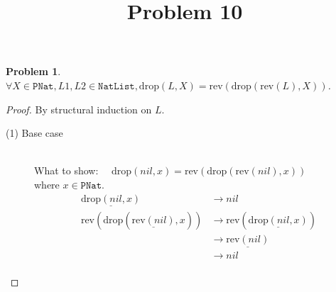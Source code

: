 \documentclass[12pt, a4paper]{article}
\title{Problem 10}
\date{\vspace{-5ex}}
\newtheorem{problem}{Problem}
\newcommand{\rmx}[1]{\mathrm{#1}}
\newcommand{\larrow}{\longrightarrow}
\newcommand{\under}{\underline}
\begin{document}
\maketitle

\begin{problem}
$\forall X \in \mathtt{PNat}, L1, L2 \in \mathtt{NatList}, \rmx{drop}(L, X) = \rmx{rev}(\rmx{drop}(\rmx{rev}(L), X))$.
\end{problem}
\begin{proof}
By structural induction on $L$.

\begin{description}
\item[(1) Base case]~\\
\noindent
What to show: $\quad \rmx{drop}(nil, x) = \rmx{rev}(\rmx{drop}(\rmx{rev}(nil), x))$ \\
where $x \in \mathtt{PNat}$.
\begin{align*}
\under{\rmx{drop}(nil, x)}
	&\larrow nil \tag{by drop1} \\
\rmx{rev}(\rmx{drop}(\under{\rmx{rev}(nil)}, x))
	&\larrow \rmx{rev}(\under{\rmx{drop}(nil, x)}) \tag{by rev1} \\
	&\larrow \under{\rmx{rev}(nil)} \tag{by drop1} \\
	&\larrow nil \tag{by rev1} \\
\end{align*}


\end{description}
\end{proof}
\end{document}
